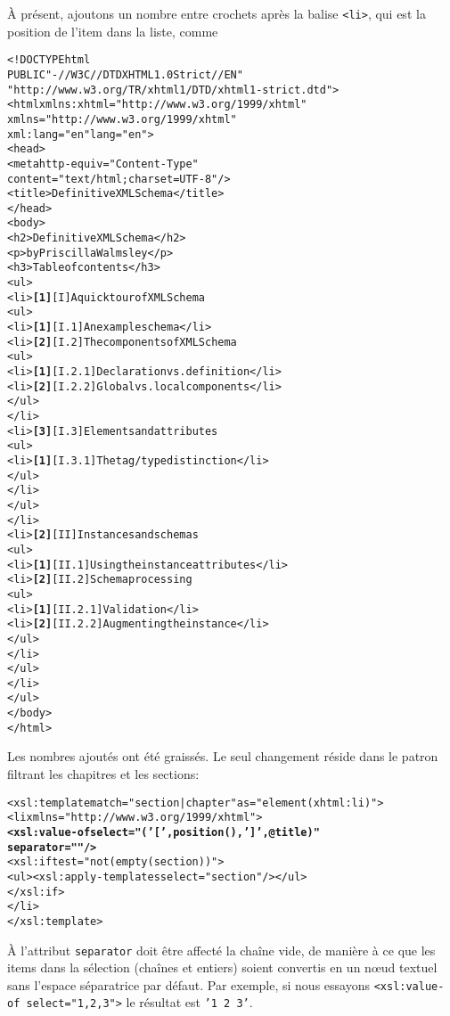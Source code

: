 À présent, ajoutons un nombre entre crochets après la balise \XHTML
\texttt{<li>}, qui est la position de l'item dans la liste, comme
\begin{alltt}
\small<!DOCTYPE html
  PUBLIC "-//W3C//DTD XHTML 1.0 Strict//EN"
         "http://www.w3.org/TR/xhtml1/DTD/xhtml1-strict.dtd">
<html xmlns:xhtml="http://www.w3.org/1999/xhtml"
      xmlns="http://www.w3.org/1999/xhtml"
      xml:lang="en" lang="en">
  <head>
    <meta http-equiv="Content-Type"
          content="text/html; charset=UTF-8"/>
    <title>Definitive XML Schema</title>
  </head>
  <body>
    <h2>Definitive XML Schema</h2>
    <p>by Priscilla Walmsley</p>
    <h3>Table of contents</h3>
    <ul>
      <li>\textbf{[1]} [I] A quick tour of XML Schema
        <ul>
          <li>\textbf{[1]} [I.1] An example schema</li>
          <li>\textbf{[2]} [I.2] The components of XML Schema
            <ul>
              <li>\textbf{[1]} [I.2.1] Declaration vs. definition</li>
              <li>\textbf{[2]} [I.2.2] Global vs. local components</li>
            </ul>
          </li>
          <li>\textbf{[3]} [I.3] Elements and attributes
            <ul>
              <li>\textbf{[1]} [I.3.1] The tag/type distinction</li>
            </ul>
          </li>
        </ul>
      </li>
      <li>\textbf{[2]} [II] Instances and schemas
        <ul>
          <li>\textbf{[1]} [II.1] Using the instance attributes</li>
          <li>\textbf{[2]} [II.2] Schema processing
            <ul>
              <li>\textbf{[1]} [II.2.1] Validation</li>
              <li>\textbf{[2]} [II.2.2] Augmenting the instance</li>
            </ul>
          </li>
        </ul>
      </li>
    </ul>
  </body>
</html>
\end{alltt}
Les nombres ajoutés ont été graissés. Le seul changement réside dans
le patron filtrant les chapitres et les sections:
\begin{alltt}
\small <xsl:template match="section|chapter" as="element(xhtml:li)">
    <li xmlns="http://www.w3.org/1999/xhtml">
      \textbf{<xsl:value-of select="('[',position(),'] ',@title)"
                    separator=""/>}
      <xsl:if test="not(empty(section))">
        <ul><xsl:apply-templates select="section"/></ul>
      </xsl:if>
    </li>
  </xsl:template>
\end{alltt}
À l'attribut \texttt{separator} doit être affecté la chaîne vide, de
manière à ce que les items dans la sélection (chaînes et entiers)
soient convertis en un n{\oe}ud textuel sans l'espace séparatrice par
défaut. Par exemple, si nous essayons \texttt{<xsl:value-of
  select="1,2,3">} le résultat est \texttt{'1 2 3'}.

